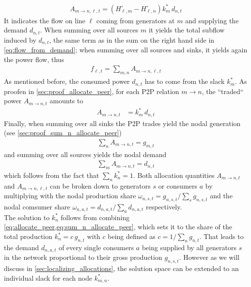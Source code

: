 \documentclass[11pt,twocolumn]{article}
\newcommand{\generation}[1][n]{g_{#1,s,t}}
\newcommand{\generationshare}[1][n]{\omega_{#1,s,t}}
\newcommand{\nodalgeneration}[1][n]{g_{#1,t}}
\newcommand{\demand}[1][n]{d_{#1,a,t}}
\newcommand{\nodaldemand}[1][n]{d_{#1,t}}
\newcommand{\demandshare}[1][n]{\omega_{#1,a,t}}
\newcommand{\ptdf}[1][n]{H_{\ell,#1}}
\newcommand{\ptdfEqual}[1][n]{\ptdf[#1]^\circ}
\newcommand{\slackk}[1][n]{k^*_{#1}}
\newcommand{\Slackk}{k^*_{m,n}}
\newcommand{\flow}{f_{\ell,t}}
\newcommand{\allocatePeer}[1][m \rightarrow n]{A_{#1,t}}
\newcommand{\allocateTransaction}[1][m \rightarrow n]{A_{#1,\ell,t}}
\begin{document}
\begin{align}
\allocateTransaction = \left(  \ptdfEqual[m] - \ptdfEqual \right) \slackk[m] \, \nodaldemand
\label{eq:allocate_transaction}
\end{align}
% 
It indicates the flow on line $\ell$ coming from generators at $m$ and supplying the demand $\nodaldemand$. When summing over all sources $m$ it yields the total subflow induced by $\nodaldemand$, the same term as in the sum on the right hand side in \cref{eq:flow_from_demand}; 
when summing over all sources and sinks, it yields again the power flow, thus
\begin{align}
\flow = \sum_{m,n} \allocateTransaction
\label{eq:transaction_sum}
\end{align}
% 
As mentioned before, the consumed power $\nodaldemand$ has to come from the slack $\slackk[m]$. As proofen in \cref{sec:proof_allocate_peer}, for each P2P relation $m \rightarrow n$, the ``traded`` power $\allocatePeer$  amounts to
\begin{align}
\allocatePeer &= \slackk[m] \, \nodaldemand 
\label{eq:allocate_peer}
\end{align}
% 
Finally, when summing over all sinks the P2P trades yield the nodal generation (see \cref{sec:proof_sum_n_allocate_peer}) 
\begin{align}
\sum_n \allocatePeer = \nodalgeneration[m]
\label{eq:sum_n_allocate_peer}
\end{align}
and summing over all sources yields the nodal demand 
\begin{align}
\sum_m \allocatePeer = \nodaldemand
\label{eq:sum_m_allocate_peer}
\end{align}
which follows from the fact that $\sum_n \slackk = 1$.
Both allocation quantities $\allocatePeer$ and $\allocateTransaction$ can be broken down to generators $s$ or consumers $a$ by multiplying with the nodal production share $\generationshare = \generation/\sum_s \generation$ and the nodal comsumer share $\demandshare = \demand/\sum_a \demand$ respectively. \\


The solution to $\slackk$ follows from combining \cref{eq:allocate_peer,eq:sum_n_allocate_peer}, which sets it to the share of the total production $\slackk = c \, \nodalgeneration$ with $c$ being defined as $c = 1/\sum_n \nodalgeneration$. That leads to the demand $\demand$ of every single consumers $a$ being supplied by all generators $s$ in the network proportional to their gross production $\generation$. However as we will discuss in \cref{sec:localizing_allocations}, the solution space can be extended to an individual slack for each node $\Slackk$.
\end{document}
